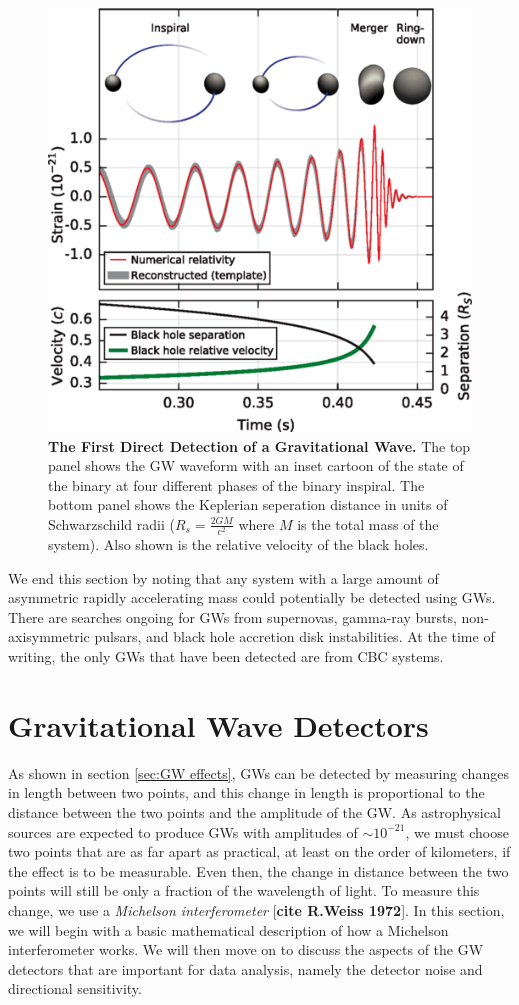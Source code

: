 \documentclass[11pt]{cuthesis}
\begin{document}
\begin{figure}[ht]
\centering
\includegraphics[width=12cm]{150914signal.png} 
\caption{\textbf{The First Direct Detection of a Gravitational Wave.} The top panel shows the GW waveform with an inset cartoon of the state of the binary at four different phases of the binary inspiral. The bottom panel shows the Keplerian seperation distance in units of Schwarzschild radii ($R_s=\frac{2GM}{c^2}$ where $M$ is the total mass of the system). Also shown is the relative velocity of the black holes.  \cite{150914-det-paper} }
\label{fig:150914 signal}
\end{figure}

We end this section by noting that any system with a large amount of asymmetric rapidly accelerating mass could potentially be detected using GWs. There are searches ongoing for GWs from supernovas, gamma-ray bursts, non-axisymmetric pulsars, and black hole accretion disk instabilities. At the time of writing, the only GWs that have been detected are from CBC systems.  

\section{Gravitational Wave Detectors} \label{sec:gw detectors}
As shown in section \ref{sec:GW effects}, GWs can be detected by measuring changes in length between two points, and this change in length is proportional to the distance between the two points and the amplitude of the GW. As astrophysical sources are expected to produce GWs with amplitudes of $\sim 10^{-21}$, we must choose two points that are as far apart as practical, at least on the order of kilometers, if the effect is to be measurable. Even then, the change in distance between the two points will still be only a fraction of the wavelength of light. To measure this change, we use a \textit{Michelson interferometer} [\textbf{cite R.Weiss 1972}]. In this section, we will begin with a basic mathematical description of how a Michelson interferometer works. We will then move on to discuss the aspects of the GW detectors that are important for data analysis, namely the detector noise and directional sensitivity.
\end{document}
